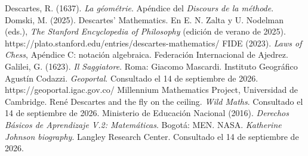 \documentclass[11pt]{article}
\begin{document}
\begin{referencias}
 Descartes, R. (1637). \emph{La géométrie}. Apéndice del \emph{Discours
  de la méthode}.
 Domski, M. (2025). Descartes' Mathematics. En E. N. Zalta y
  U. Nodelman (eds.), \emph{The Stanford Encyclopedia of Philosophy} (edición de verano de
  2025). https://plato.stanford.edu/entries/descartes-mathematics/
 FIDE (2023). \emph{Laws of Chess}, Apéndice C: notación algebraica. Federación
  Internacional de Ajedrez.
 Galilei, G. (1623). \emph{Il Saggiatore}. Roma: Giacomo Mascardi.
 Instituto Geográfico Agustín Codazzi. \emph{Geoportal}. Consultado el 14 de
  septiembre de 2026. https://geoportal.igac.gov.co/
 Millennium Mathematics Project, Universidad de Cambridge. René Descartes
  and the fly on the ceiling. \emph{Wild Maths}. Consultado el 14 de septiembre de 2026.
 Ministerio de Educación Nacional (2016). \emph{Derechos Básicos de
  Aprendizaje V.2: Matemáticas}. Bogotá: MEN.
 NASA. \emph{Katherine Johnson biography}. Langley Research Center.
  Consultado el 14 de septiembre de 2026.
\end{referencias}
\end{document}
